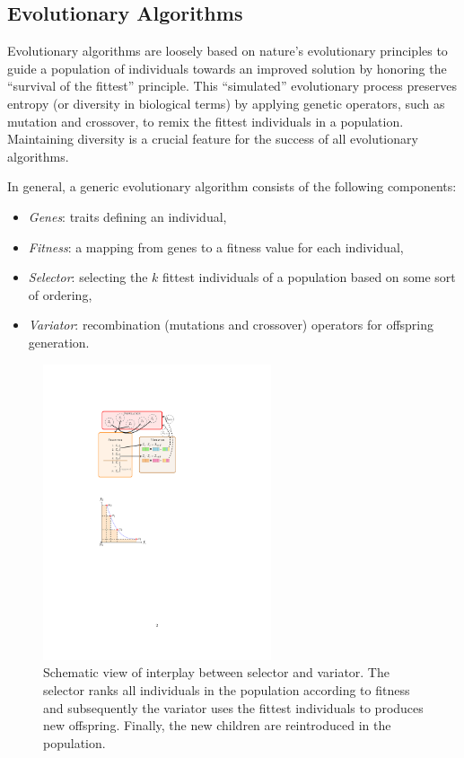 \documentclass[preprint,linenumbers,amsmath,amssymb,aps,prstab]{revtex4-1}%
\begin{document}
\subsection{Evolutionary Algorithms}

Evolutionary algorithms are loosely based on nature's evolutionary
  principles to guide a population of individuals towards an improved solution
  by honoring the ``survival of the fittest'' principle.
This ``simulated'' evolutionary process preserves entropy (or diversity in
  biological terms) by applying genetic operators, such as mutation and
  crossover, to remix the fittest individuals in a population.
Maintaining diversity is a crucial feature for the success of all evolutionary
  algorithms.

In general, a generic evolutionary algorithm consists of the following
  components:
%
\begin{itemize}
  \item \textit{Genes}: traits defining an individual,
  \item \textit{Fitness}: a mapping from genes to a fitness value for each
    individual,
  \item \textit{Selector}: selecting the $k$ fittest individuals of a
    population based on some sort of ordering,
  \item \textit{Variator}: recombination (mutations and crossover) operators
    for offspring generation.
\end{itemize}

\begin{figure}
    \centering
    \includegraphics[width=0.6\textwidth]{ga_explained_big}
  \caption{Schematic view of interplay between selector and variator. The
  selector ranks all individuals in the population according to fitness and
  subsequently the variator uses the fittest individuals to produces new
  offspring. Finally, the new children are reintroduced in the population.}
  \label{fig:varsel}
\end{figure}
\end{document}
